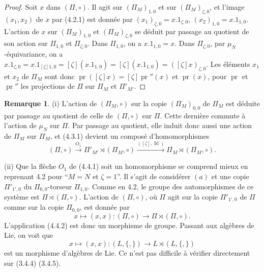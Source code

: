 \documentclass[11pt,a4paper]{article}
\theoremstyle{plain}
\theoremstyle{definition}
\newtheorem{remark}[theorem]{Remarque}
\DeclareMathOperator{\pr}{pr}
\DeclareMathOperator{\Id}{Id}
\begin{document}
\begin{proof}
Soit $x$ dans $(\Pi, \circ)$. Il agit sur $(\Pi_M)_{1,0}$ et sur $(\Pi_M)_{\zeta,0}$, et l'image $(x_1, x_2)$ de $x$ par (4.2.1) est donn\'ee par $(x_1)_{\zeta,0} = x.1_{\zeta,0}$, $(x_2)_{1,0} = x.1_{1,0}$. L'action de $x$ sur $(\Pi_M)_{1,0}$ et $(\Pi_M)_{\zeta,0}$ se d\'eduit par passage au quotient de son action sur $\Pi_{1,0}$ et $\Pi_{\zeta,0}$. Dans $\Pi_{1,0}$, on a $x.1_{1,0} = x$. Dans $\Pi_{\zeta,0}$, par $\mu_N$-\'equivariance, on a $x.1_{\zeta,0} = x.1_{[\zeta]1,0} = [\zeta](x.1_{1,0}) = [\zeta](x.1_{1,0}) = ([\zeta]x)_{\zeta,0}$. Les \'el\'ements $x_1$ et $x_2$ de $\Pi_M$ sont donc $\pr([\zeta]x) = [\zeta]\pr''(x)$ et $\pr(x)$, pour $\pr$ et $\pr''$ les projections de $\Pi$ sur $\Pi_M$ et $\Pi'_{M'}$.
\end{proof}

\begin{remark}\label{rmk:4.4}
(i) L'action de $(\Pi_M, \circ)$ sur la copie $(\Pi_M)_{0,0}$ de $\Pi_M$ est d\'eduite par passage au quotient de celle de $(\Pi, \circ)$ sur $\Pi$. Cette derni\`ere commute \`a l'action de $\mu_N$ sur $\Pi$. Par passage au quotient, elle induit donc aussi une action de $\Pi_M$ sur $\Pi_M$, et (4.3.1) devient un compos\'e d'homomorphismes
\begin{equation}\label{eq:4.4.1}
(\Pi, \circ) \xrightarrow{O_1} \Pi'_{M'} \rtimes (\Pi_M, \circ) \xrightarrow{([\zeta], \Id)} \Pi_M \rtimes (\Pi_M, \circ).
\end{equation}

(ii) Que la fl\`eche $O_1$ de (4.4.1) soit un homomorphisme se comprend mieux en reprenant 4.2 pour ``$M=N$ et $\zeta=1$''. Il s'agit de consid\'erer $(a)$ et une copie $\Pi'_{1',0}$ du $\Pi_{0,0}$-torseur $\Pi_{1,0}$. Comme en 4.2, le groupe des automorphismes de ce syst\`eme est $\Pi \rtimes (\Pi, \circ)$. L'action de $(\Pi, \circ)$, o\`u $\Pi$ agit sur la copie $\Pi'_{1',0}$ de $\Pi$ comme sur la copie $\Pi_{0,0}$, est donn\'ee par
\begin{equation}\label{eq:4.4.2}
x \mapsto (x,x): (\Pi, \circ) \to \Pi \rtimes (\Pi, \circ).
\end{equation}
L'application (4.4.2) est donc un morphisme de groupe. Passant aux alg\`ebres de Lie, on voit que
\begin{equation}\label{eq:4.4.3}
x \mapsto (x,x): (L, \{,\}) \to L \rtimes (L, \{,\})
\end{equation}
est un morphisme d'alg\`ebres de Lie. Ce n'est pas difficile \`a v\'erifier directement sur (3.4.4) (3.4.5).
\end{remark}
\end{document}
